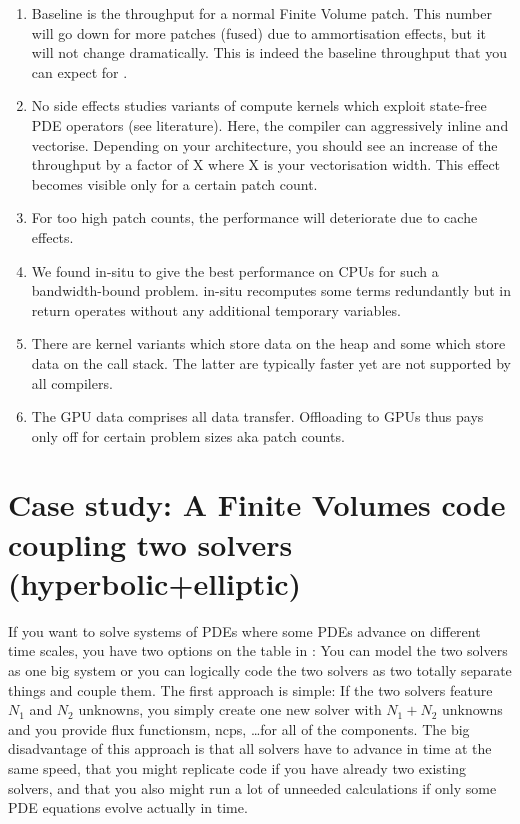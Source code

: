 \begin{framed}
\begin{enumerate}
  \item Baseline is the throughput for a normal Finite Volume patch. This number
  will go down for more patches (fused) due to ammortisation effects, but it
  will not change dramatically. This is indeed the baseline throughput that you
  can expect for \ExaHyPE.
  \item No side effects studies variants of compute kernels which exploit
  state-free PDE operators (see literature). Here, the compiler can aggressively
  inline and vectorise. Depending on your architecture, you should see an
  increase of the throughput by a factor of X where X is your vectorisation
  width. This effect becomes visible only for a certain patch count.
  \item For too high patch counts, the performance will deteriorate due to cache
  effects.
  \item We found in-situ to give the best performance on CPUs for such a
  bandwidth-bound problem. in-situ recomputes some terms redundantly but in
  return operates without any additional temporary variables.
  \item There are kernel variants which store data on the heap and some which
  store data on the call stack. The latter are typically faster yet are not
  supported by all compilers.
  \item The GPU data comprises all data transfer. Offloading to GPUs thus pays
  only off for certain problem sizes aka patch counts.
\end{enumerate}


\end{framed}


\section{Case study: A Finite Volumes code coupling two solvers (hyperbolic+elliptic)}
\label{section:exahype:fv:coupling}

If you want to solve systems of PDEs where some PDEs advance on different time
scales, you have two options on the table in \ExaHyPE: 
You can model the two solvers as one big system or you can logically code the
two solvers as two totally separate things and couple them.
The first approach is simple: If the two solvers feature $N_1$ and $N_2$ unknowns,
you simply create one new solver with $N_1+N_2$ unknowns and you provide flux 
functionsm, ncps, \ldots for all of the components.
The big disadvantage of this approach is that all solvers have to advance in time
at the same speed, that you might replicate code if you have already two existing
solvers, and that you also might run a lot of unneeded calculations if only some
PDE equations evolve actually in time.


